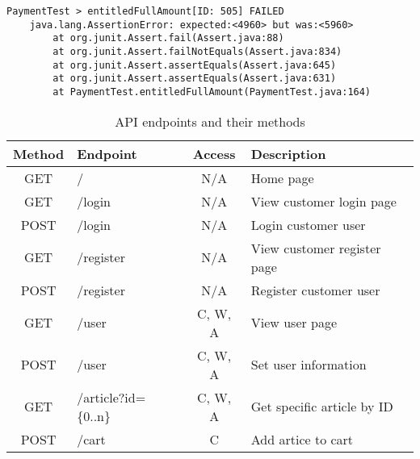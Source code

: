 \documentclass{article}
\begin{document}
\begin{verbatim}
PaymentTest > entitledFullAmount[ID: 505] FAILED
    java.lang.AssertionError: expected:<4960> but was:<5960>
        at org.junit.Assert.fail(Assert.java:88)
        at org.junit.Assert.failNotEquals(Assert.java:834)
        at org.junit.Assert.assertEquals(Assert.java:645)
        at org.junit.Assert.assertEquals(Assert.java:631)
        at PaymentTest.entitledFullAmount(PaymentTest.java:164)
\end{verbatim}

\begin{table}[H]
\centering
\caption{API endpoints and their methods}
\begin{tabular}{|clcl|}
\hline
\textbf{Method}              & \textbf{Endpoint}                             & \textbf{Access}              & \textbf{Description}                 \\ \hline
\multicolumn{1}{|c|}{GET}    & \multicolumn{1}{l|}{/}                        & \multicolumn{1}{c|}{N/A}     & Home page                            \\
\multicolumn{1}{|c|}{GET}    & \multicolumn{1}{l|}{/login}                   & \multicolumn{1}{c|}{N/A}     & View customer login page                      \\
\multicolumn{1}{|c|}{POST}   & \multicolumn{1}{l|}{/login}                   & \multicolumn{1}{c|}{N/A}     & Login customer user                           \\
\multicolumn{1}{|c|}{GET}    & \multicolumn{1}{l|}{/register}                & \multicolumn{1}{c|}{N/A}     & View customer register page                   \\
\multicolumn{1}{|c|}{POST}   & \multicolumn{1}{l|}{/register}                & \multicolumn{1}{c|}{N/A}     & Register customer user                        \\
\multicolumn{1}{|c|}{GET}    & \multicolumn{1}{l|}{/user}                    & \multicolumn{1}{c|}{C, W, A} & View user page                       \\
\multicolumn{1}{|c|}{POST}   & \multicolumn{1}{l|}{/user}                    & \multicolumn{1}{c|}{C, W, A} & Set user information                 \\
\multicolumn{1}{|c|}{GET}    & \multicolumn{1}{l|}{/article?id=\{0..n\}}     & \multicolumn{1}{c|}{C, W, A} & Get specific article by ID           \\
\multicolumn{1}{|c|}{POST}   & \multicolumn{1}{l|}{/cart}                    & \multicolumn{1}{c|}{C}       & Add artice to cart                   \\

\end{tabular}
\end{table}
\end{document}
